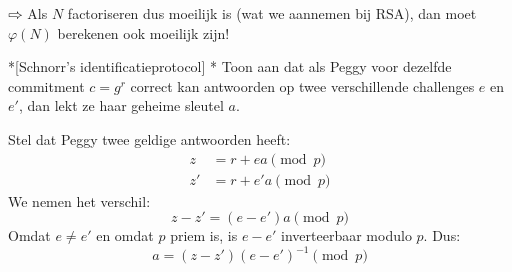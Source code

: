 $\rightwhitearrow$ Als $N$ factoriseren dus moeilijk is (wat we aannemen bij RSA), dan moet $\varphi(N)$ berekenen ook moeilijk zijn!

\begin{niceexercise}*[Schnorr's identificatieprotocol]\label{ex:l7_schnorr-lek}
    \nextpart[]*
    Toon aan dat als Peggy voor dezelfde commitment $c=g^r$ correct kan antwoorden op twee verschillende challenges $e$ en $e'$, dan lekt ze haar geheime sleutel $a$.
\end{niceexercise}

Stel dat Peggy twee geldige antwoorden heeft:
\begin{equation*}
    \begin{aligned}
        z &= r + ea \pmod p \\
        z' &= r + e'a \pmod p
    \end{aligned}
\end{equation*}
We nemen het verschil:
\begin{equation*}
    z - z' = (e - e')a \pmod p
\end{equation*}
Omdat $e \neq e'$ en omdat $p$ priem is, is $e - e'$ inverteerbaar modulo $p$. Dus:
\begin{equation*}
    a = (z - z')(e - e')^{-1} \pmod p 
\end{equation*}


